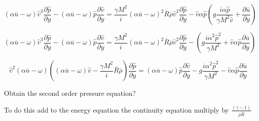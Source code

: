 \begin{equation*} 
        (\alpha\overline{u}-\omega)
        \hat{v}^3
        \frac{\partial \hat{p}}{\partial y}
        -
        (\alpha\overline{u}-\omega)
        \hat{p}
        \frac{\partial \hat{v}}{\partial y}
        =
        \frac{\gamma M^2 }{i }
        (\alpha\overline{u}-\omega)^2
        \overline{R}
        \overline{\rho}
        \hat{v}^2
        \frac{\partial \hat{p}}{\partial y}
        -
        \hat{v}
        \alpha \hat{p}
        \left(
            g\frac{i\alpha \hat{p}}{\gamma M^2 \hat{v}}
            +
            \frac{\partial \overline{u}}{\partial y}
        \right)
\end{equation*} 

\begin{equation*} 
        (\alpha\overline{u}-\omega)
        \hat{v}^3
        \frac{\partial \hat{p}}{\partial y}
        -
        (\alpha\overline{u}-\omega)
        \hat{p}
        \frac{\partial \hat{v}}{\partial y}
        =
        \frac{\gamma M^2 }{i }
        (\alpha\overline{u}-\omega)^2
        \overline{R}
        \overline{\rho}
        \hat{v}^2
        \frac{\partial \hat{p}}{\partial y}
        -
        \left(
            g\frac{i\alpha^2 \hat{p}^2}{\gamma M^2}
            +
            \hat{v}
            \alpha \hat{p}
            \frac{\partial \overline{u}}{\partial y}
        \right)
\end{equation*} 

\begin{equation*} 
        \hat{v}^2
        (\alpha\overline{u}-\omega)
        \left(
        (\alpha\overline{u}-\omega)
        \hat{v}
        -
        \frac{\gamma M^2 }{i }
        \overline{R}
        \overline{\rho}
        \right)
        \frac{\partial \hat{p}}{\partial y}
        =
        (\alpha\overline{u}-\omega)
        \hat{p}
        \frac{\partial \hat{v}}{\partial y}
        -
        g\frac{i\alpha^2 \hat{p}^2}{\gamma M^2}
        -
        \hat{v}
        \alpha \hat{p}
        \frac{\partial \overline{u}}{\partial y}
\end{equation*} 



{\color{red}
Obtain the second order pressure equation?
}

To do this add  to the 
energy equation the continuity equation multiply by 
$\frac{(\gamma-1)}{\overline{\rho}\overline{R}}$ 

